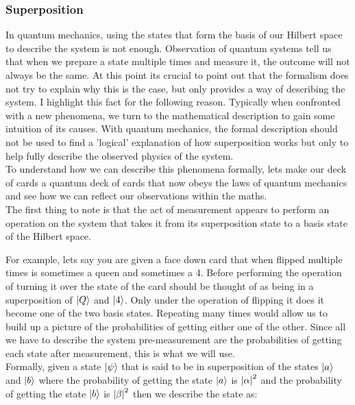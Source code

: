 \subsubsection{Superposition}

In quantum mechanics, using the states that form the basis of our Hilbert space to describe the system is not enough. Observation of quantum systems tell us that when we prepare a state multiple times and measure it, the outcome will not always be the same. At this point its crucial to point out that the formalism does not try to explain why this is the case, but only provides a way of describing the system. I highlight this fact for the following reason. Typically when confronted with a new phenomena, we turn to the mathematical description to gain some intuition of its causes. With quantum mechanics, the formal description should not be used to find a 'logical' explanation of how superposition works but only to help fully describe the observed physics of the system.\\

To understand how we can describe this phenomena formally, lets make our deck of cards a quantum deck of cards that now obeys the laws of quantum mechanics and see how we can reflect our observations within the maths.\\

The first thing to note is that the act of measurement appears to perform an operation on the system that takes it from its superposition state to a basis state of the Hilbert space.

For example, lets say you are given a face down card that when flipped multiple times is sometimes a queen and sometimes a 4. Before performing the operation of turning it over the state of the card should be thought of as being in a superposition of $\left\vert{Q}\right\rangle$ and $\left\vert{4}\right\rangle$. Only under the operation of flipping it does it become one of the two basis states. Repeating many times would allow us to build up a picture of the probabilities of getting either one of the other. Since all we have to describe the system pre-measurement are the probabilities of getting each state after measurement, this is what we will use.\\

Formally, given a state $\left\vert{\psi}\right\rangle$ that is said to be in superposition of the states $\left\vert{a}\right\rangle$ and $\left\vert{b}\right\rangle$ where the probability of getting the state $\left\vert{a}\right\rangle$ is $\abs{\alpha}^{2}$ and the probability of getting the state $\left\vert{b}\right\rangle$ is $\abs{\beta}^{2}$ then we describe the state as:

